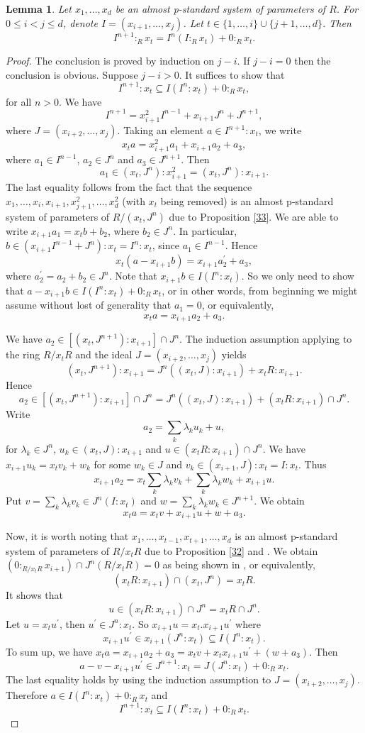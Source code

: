 \documentclass{amsart}
\newtheorem{lemma}[theorem]{Lemma}
\theoremstyle {definition}
\theoremstyle {remark}
\begin{document}
\begin{lemma}\label{35}
Let $x_1,\ldots, x_d$ be an almost p-standard system of parameters of $R$. For $0\leq i<j\leq d$, denote $I=(x_{i+1}, \ldots, x_j)$. Let $t\in \{1,\ldots, i\}\cup\{j+1,\ldots, d\}$. Then
$$I^{n+1}:_Rx_t=I^n(I:_Rx_t)+0:_Rx_t.$$
\end{lemma}
\begin{proof}
The conclusion is proved by induction on $j-i$. If $j-i=0$ then the conclusion is obvious. Suppose $j-i>0$. It suffices to show that
$$I^{n+1}:x_t\subseteq I(I^n:x_t)+0:_Rx_t,$$
for all $n>0$. We have
$$I^{n+1}=x_{i+1}^2I^{n-1}+x_{i+1}J^n+J^{n+1},$$
where $J=(x_{i+2}, \ldots, x_j)$. Taking an element $a\in I^{n+1}:x_t$, we write
$$x_ta=x_{i+1}^2a_1+x_{i+1}a_2+a_3,$$
where $a_1\in I^{n-1}$, $a_2\in J^n$ and $a_3\in J^{n+1}$. Then
$$a_1\in (x_t, J^n):x_{i+1}^2=(x_t, J^n):x_{i+1}.$$
The last equality follows from the fact that the sequence $x_1, \ldots, x_i, x_{i+1}, x_{j+1}^2, \ldots, x_d^2$ (with $x_t$ being removed) is an almost p-standard system of parameters of $R/(x_t, J^n)$ due to Proposition \ref{33}. We are able to write $x_{i+1}a_1=x_tb+b_2$, where $b_2\in J^n$. In particular, $b\in (x_{i+1}I^{n-1}+J^n):x_t= I^n:x_t$, since $a_1\in I^{n-1}$. Hence
$$x_t(a-x_{i+1}b)=x_{i+1}a_2^\prime +a_3,$$
where $a_2^\prime=a_2+b_2\in J^n$. Note that $x_{i+1}b\in I(I^n:x_t)$. So we only need to show that $a-x_{i+1}b\in I(I^n:x_t)+0:_Rx_t$, or in other words, from beginning we might assume without lost of generality that $a_1=0$, or equivalently,
$$x_ta=x_{i+1}a_2+a_3.$$

We have $a_2\in [(x_t, J^{n+1}):x_{i+1}]\cap J^n$. The induction assumption applying to the ring $R/x_tR$ and the ideal $J=(x_{i+2}, \ldots, x_j)$ yields
$$(x_t, J^{n+1}):x_{i+1}=J^n((x_t, J):x_{i+1})+x_tR:x_{i+1}.$$
Hence
$$a_2\in [(x_t, J^{n+1}):x_{i+1}]\cap J^n=J^n((x_t, J):x_{i+1})+(x_tR:x_{i+1})\cap J^n.$$
Write
$$a_2=\sum_k\lambda_ku_k+u,$$
for $\lambda_k\in J^n$, $u_k\in (x_t, J):x_{i+1}$ and $u\in (x_tR:x_{i+1})\cap J^n$. We have $x_{i+1}u_k=x_tv_k+w_k$ for some $w_k\in J$ and $v_k\in (x_{i+1}, J):x_t=I:x_t$. Thus
$$x_{i+1}a_2=x_t\sum_k\lambda_kv_k+\sum_k\lambda_kw_k+x_{i+1}u.$$
Put $v=\sum_k\lambda_kv_k\in J^n(I:x_t)$ and $w=\sum_k\lambda_kw_k\in J^{n+1}$. We obtain
$$x_ta=x_tv+x_{i+1}u+w+a_3.$$

Now, it is worth noting that $x_1, \ldots, x_{t-1}, x_{t+1}, \ldots, x_d$ is an almost p-standard system of parameters of $R/x_tR$ due to Proposition \ref{32} and \cite[Proposition 3.4]{NTCDTC1}. We obtain $(0:_{R/x_tR}x_{i+1})\cap J^n(R/x_tR)=0$ as being shown in \cite[Corollary 3.7]{NTCDTC3}, or equivalently,
$$(x_tR:x_{i+1})\cap (x_t, J^n)=x_tR.$$
It shows that
$$u\in  (x_tR:x_{i+1})\cap J^n= x_tR\cap J^n.$$
Let $u=x_tu^\prime$, then $u^\prime\in J^n:x_t$. So $x_{i+1}u=x_t.x_{i+1}u^\prime$ where
$$x_{i+1}u^\prime\in x_{i+1}(J^n:x_t)\subseteq I(I^n:x_t).$$
To sum up, we have $x_ta=x_{i+1}a_2+a_3=x_tv+x_tx_{i+1}u^\prime+(w+a_3)$. Then
$$a-v-x_{i+1}u^\prime\in J^{n+1}:x_t=J(J^n:x_t)+0:_Rx_t.$$
The last equality holds by using the induction assumption to $J=(x_{i+2}, \ldots, x_j)$. Therefore $a\in I(I^n:x_t)+0:_Rx_t$ and
$$I^{n+1}:x_t\subseteq I(I^n:x_t)+0:_Rx_t.$$
\end{proof}
\end{document}
